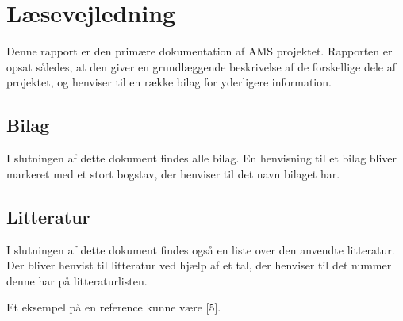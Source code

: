 \section*{Læsevejledning}
Denne rapport er den primære dokumentation af AMS projektet. Rapporten er opsat således, at den giver en grundlæggende beskrivelse af de forskellige dele af projektet, og henviser til en række bilag for yderligere information.

\subsection*{Bilag}
I slutningen af dette dokument findes alle bilag.
En henvisning til et bilag bliver markeret med et stort bogstav, der henviser til det navn bilaget har.

\subsection*{Litteratur}
I slutningen af dette dokument findes også en liste over den anvendte litteratur.
Der bliver henvist til litteratur ved hjælp af et tal, der henviser til det nummer denne har på litteraturlisten.

Et eksempel på en reference kunne være [5]. 


%